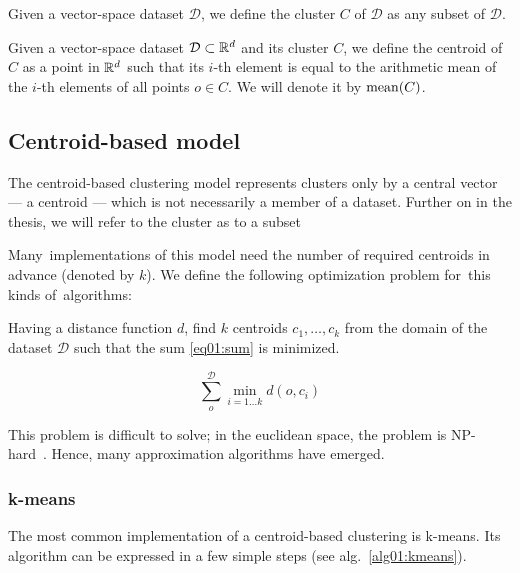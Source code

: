 \begin{defn}[Cluster]
	Given a vector-space dataset $\mathcal{D}$, we define the cluster $C$ of $\mathcal{D}$ as any subset of $\mathcal{D}$.
\end{defn}

\begin{defn}[Centroid]
	Given a vector-space dataset $\mathcal{D}\subset\mathbb{R}^d$ and its cluster $C$, we define the centroid of $C$ as a point in $\mathbb{R}^d$ such that its $i$-th element is equal to the arithmetic mean of the $i$-th elements of all points $o \in C$. We will denote it by $\operatorname{mean}(C)$.
	\label{def01:centr}
\end{defn}

\subsection{Centroid-based model}

The centroid-based clustering model represents clusters only by a central vector --- a centroid --- which is not necessarily a member of a dataset. Further on in the thesis, we will refer to the cluster as to a subset 

Many~implementations of this model need the number of required centroids in advance (denoted by $k$). We define the following optimization problem for~this kinds of~algorithms:

\begin{problem}
	Having a distance function $d$, find $k$ centroids $c_1,\dots,c_k$ from the domain of the dataset $\mathcal{D}$ such that the sum \ref{eq01:sum}
	is minimized.
\end{problem}

\begin{equation}\label{eq01:sum}
	\sum_o^{\mathcal{D}} \min_{i=1\dots k}d(o,c_i)
\end{equation}

This problem is difficult to solve; in the euclidean space, the problem is NP-hard~\cite{aloise2009np}. Hence, many approximation algorithms have emerged. 

\subsubsection{k-means}

The most common implementation of a centroid-based clustering is k-means. Its algorithm can be expressed in a few simple steps (see alg.~\ref{alg01:kmeans}).

